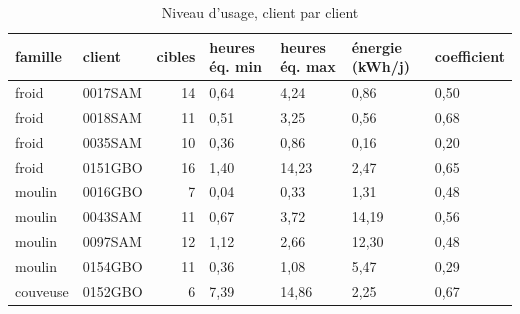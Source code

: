 \begin{table}[htbp]
\caption{Niveau d'usage, client par client}
\label{tab:transfert_niveaux}
\begin{tabular}{llrllll}
\toprule
famille & client & cibles & heures éq. min & heures éq. max & énergie (kWh/j) & coefficient \\
\midrule
froid & 0017SAM & 14 & 0,64 & 4,24 & 0,86 & 0,50 \\
froid & 0018SAM & 11 & 0,51 & 3,25 & 0,56 & 0,68 \\
froid & 0035SAM & 10 & 0,36 & 0,86 & 0,16 & 0,20 \\
froid & 0151GBO & 16 & 1,40 & 14,23 & 2,47 & 0,65 \\
moulin & 0016GBO & 7 & 0,04 & 0,33 & 1,31 & 0,48 \\
moulin & 0043SAM & 11 & 0,67 & 3,72 & 14,19 & 0,56 \\
moulin & 0097SAM & 12 & 1,12 & 2,66 & 12,30 & 0,48 \\
moulin & 0154GBO & 11 & 0,36 & 1,08 & 5,47 & 0,29 \\
couveuse & 0152GBO & 6 & 7,39 & 14,86 & 2,25 & 0,67 \\
\bottomrule
\end{tabular}
\end{table}
